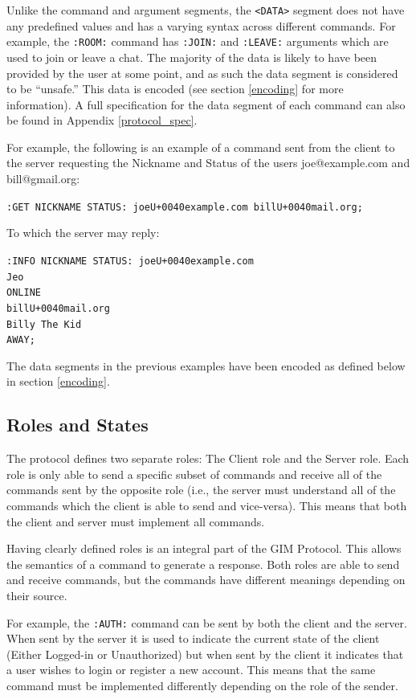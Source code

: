 Unlike the command and argument segments, the \texttt{<DATA>} segment does not have any predefined values and has a varying syntax across different commands.  For example, the \texttt{:ROOM:} command has \texttt{:JOIN:} and \texttt{:LEAVE:} arguments which are used to join or leave a chat. The majority of the data is likely to have been provided by the user at some point, and as such the data segment is considered to be ``unsafe.'' This data is encoded (see section \ref{encoding} for more information). A full specification for the data segment of each command can also be found in Appendix \ref{protocol_spec}.

For example, the following is an example of a command sent from the client to the server requesting the Nickname and Status of the users joe@example.com and bill@gmail.org:

\texttt{:GET NICKNAME STATUS: joe\SLASH U+0040example.com bill\SLASH U+0040mail.org;}

To which the server may reply:

\texttt{:INFO NICKNAME STATUS: joe\SLASH U+0040example.com\\
Jeo\\
ONLINE\\
bill\SLASH U+0040mail.org\\
Billy The Kid\\
AWAY;}

The data segments in the previous examples have been encoded as defined below in section \ref{encoding}.

\subsection{Roles and States}

The protocol defines two separate roles: The Client role and the Server role. Each role is only able to send a specific subset of commands and receive all of the commands sent by the opposite role (i.e., the server must understand all of the commands which the client is able to send and vice-versa). This means that both the client and server must implement all commands.

Having clearly defined roles is an integral part of the GIM Protocol. This allows the semantics of a command to generate a response. Both roles are able to send and receive commands, but the commands have different meanings depending on their source. 

For example, the \texttt{:AUTH:} command can be sent by both the client and the server. When sent by the server it is used to indicate the current state of the client (Either Logged-in or Unauthorized) but when sent by the client it indicates that a user wishes to login or register a new account. This means that the same command must be implemented differently depending on the role of the sender.

